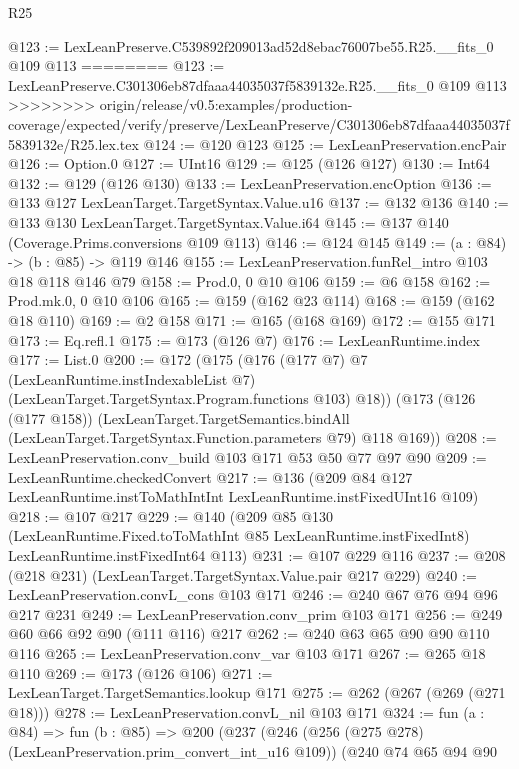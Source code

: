 \begin{lexlean}{R25}
\begin{coremodule}
{{{{{@123 := LexLeanPreserve.C539892f209013ad52d8ebac76007be55.R25.__fits_0 @109 @113
========
@123 := LexLeanPreserve.C301306eb87dfaaa44035037f5839132e.R25.__fits_0 @109 @113
>>>>>>>> origin/release/v0.5:examples/production-coverage/expected/verify/preserve/LexLeanPreserve/C301306eb87dfaaa44035037f5839132e/R25.lex.tex
@124 := @120 @123
@125 := LexLeanPreservation.encPair
@126 := Option.{0}
@127 := UInt16
@129 := @125 (@126 @127)
@130 := Int64
@132 := @129 (@126 @130)
@133 := LexLeanPreservation.encOption
@136 := @133 @127 LexLeanTarget.TargetSyntax.Value.u16
@137 := @132 @136
@140 := @133 @130 LexLeanTarget.TargetSyntax.Value.i64
@145 := @137 @140 (Coverage.Prims.conversions @109 @113)
@146 := @124 @145
@149 := (a : @84) -> (b : @85) -> @119 @146
@155 := LexLeanPreservation.funRel_intro @103 @18 @118 @146 @79
@158 := Prod.{0, 0} @10 @106
@159 := @6 @158
@162 := Prod.mk.{0, 0} @10 @106
@165 := @159 (@162 @23 @114)
@168 := @159 (@162 @18 @110)
@169 := @2 @158
@171 := @165 (@168 @169)
@172 := @155 @171
@173 := Eq.refl.{1}
@175 := @173 (@126 @7)
@176 := LexLeanRuntime.index
@177 := List.{0}
@200 := @172
    (@175
      (@176
        (@177 @7)
        @7
        (LexLeanRuntime.instIndexableList @7)
        (LexLeanTarget.TargetSyntax.Program.functions @103)
        @18))
    (@173
      (@126 (@177 @158))
      (LexLeanTarget.TargetSemantics.bindAll
        (LexLeanTarget.TargetSyntax.Function.parameters @79)
        @118
        @169))
@208 := LexLeanPreservation.conv_build @103 @171 @53 @50 @77 @97 @90
@209 := LexLeanRuntime.checkedConvert
@217 := @136 (@209 @84 @127 LexLeanRuntime.instToMathIntInt LexLeanRuntime.instFixedUInt16 @109)
@218 := @107 @217
@229 := @140
    (@209
      @85
      @130
      (LexLeanRuntime.Fixed.toToMathInt @85 LexLeanRuntime.instFixedInt8)
      LexLeanRuntime.instFixedInt64
      @113)
@231 := @107 @229 @116
@237 := @208 (@218 @231) (LexLeanTarget.TargetSyntax.Value.pair @217 @229)
@240 := LexLeanPreservation.convL_cons @103 @171
@246 := @240 @67 @76 @94 @96 @217 @231
@249 := LexLeanPreservation.conv_prim @103 @171
@256 := @249 @60 @66 @92 @90 (@111 @116) @217
@262 := @240 @63 @65 @90 @90 @110 @116
@265 := LexLeanPreservation.conv_var @103 @171
@267 := @265 @18 @110
@269 := @173 (@126 @106)
@271 := LexLeanTarget.TargetSemantics.lookup @171
@275 := @262 (@267 (@269 (@271 @18)))
@278 := LexLeanPreservation.convL_nil @103 @171
@324 := fun (a : @84) =>
  fun (b : @85) =>
  @200
    (@237
      (@246
        (@256 (@275 @278) (LexLeanPreservation.prim_convert_int_u16 @109))
        (@240
          @74
          @65
          @94
          @90
}}}}}
\end{coremodule}
\end{lexlean}
